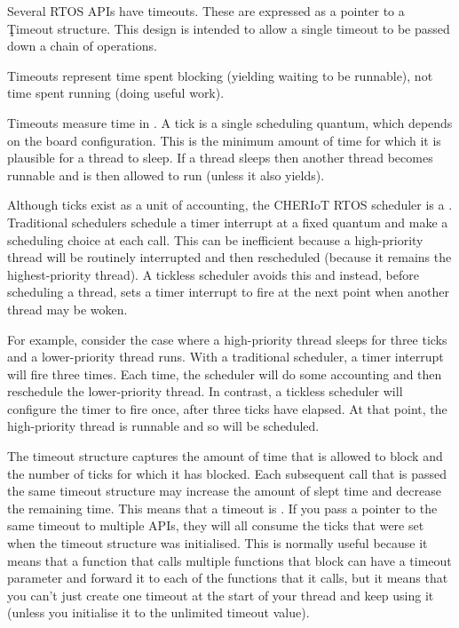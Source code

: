 Several RTOS APIs have timeouts.
These are expressed as a pointer to a \c{Timeout} structure.
This design is intended to allow a single timeout to be passed down a chain of operations.

\begin{note}
Timeouts represent time spent blocking (yielding waiting to be runnable), not time spent running (doing useful work).
\end{note}

Timeouts measure time in .
A tick is a single scheduling quantum, which depends on the board configuration.
This is the minimum amount of time for which it is plausible for a thread to sleep.
If a thread sleeps then another thread becomes runnable and is then allowed to run (unless it also yields).

Although ticks exist as a unit of accounting, the CHERIoT RTOS scheduler is a .
Traditional schedulers schedule a timer interrupt at a fixed quantum and make a scheduling choice at each call.
This can be inefficient because a high-priority thread will be routinely interrupted and then rescheduled (because it remains the highest-priority thread).
A tickless scheduler avoids this and instead, before scheduling a thread, sets a timer interrupt to fire at the next point when another thread may be woken.

For example, consider the case where a high-priority thread sleeps for three ticks and a lower-priority thread runs.
With a traditional scheduler, a timer interrupt will fire three times.
Each time, the scheduler will do some accounting and then reschedule the lower-priority thread.
In contrast, a tickless scheduler will configure the timer to fire once, after three ticks have elapsed.
At that point, the high-priority thread is runnable and so will be scheduled.

The timeout structure captures the amount of time that is allowed to block and the number of ticks for which it has blocked.
Each subsequent call that is passed the same timeout structure may increase the amount of slept time and decrease the remaining time.
This means that a timeout is .
If you pass a pointer to the same timeout to multiple APIs, they will all consume the ticks that were set when the timeout structure was initialised.
This is normally useful because it means that a function that calls multiple functions that block can have a timeout parameter and forward it to each of the functions that it calls, but it means that you can't just create one timeout at the start of your thread and keep using it (unless you initialise it to the unlimited timeout value).

